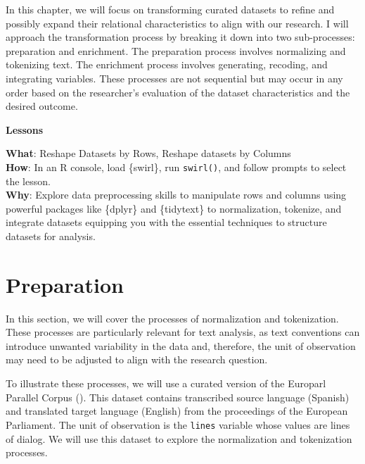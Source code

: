 \documentclass[
  letterpaper,
  krantz1]{latex/krantz-mod}
\theoremstyle{definition}
\theoremstyle{definition}
\theoremstyle{remark}
\begin{document}
In this chapter, we will focus on transforming curated datasets to
refine and possibly expand their relational characteristics to align
with our research. I will approach the transformation process by
breaking it down into two sub-processes: preparation and enrichment. The
preparation process involves normalizing and tokenizing text. The
enrichment process involves generating, recoding, and integrating
variables. These processes are not sequential but may occur in any order
based on the researcher's evaluation of the dataset characteristics and
the desired outcome.

\begin{tcolorbox}[enhanced jigsaw, toprule=.15mm, breakable, colback=white, arc=.35mm, left=2mm, colframe=quarto-callout-color-frame, opacityback=0, bottomrule=.15mm, rightrule=.15mm, leftrule=.75mm]

\textbf{ Lessons}

\textbf{What}: Reshape Datasets by Rows, Reshape datasets by Columns\\
\textbf{How}: In an R console, load \{swirl\}, run \texttt{swirl()}, and
follow prompts to select the lesson.\\
\textbf{Why}: Explore data preprocessing skills to manipulate rows and
columns using powerful packages like \{dplyr\} and \{tidytext\} to
normalization, tokenize, and integrate datasets equipping you with the
essential techniques to structure datasets for analysis.

\end{tcolorbox}

\section{Preparation}\label{sec-transform-preparation}

In this section, we will cover the processes of normalization and
tokenization. These processes are particularly relevant for text
analysis, as text conventions can introduce unwanted variability in the
data and, therefore, the unit of observation may need to be adjusted to
align with the research question.

To illustrate these processes, we will use a curated version of the
Europarl Parallel Corpus (). This dataset contains
transcribed source language (Spanish) and translated target language
(English) from the proceedings of the European Parliament. The unit of
observation is the \texttt{lines} variable
whose values are lines of dialog. We will use this dataset to explore
the normalization and tokenization
processes.
\end{document}
